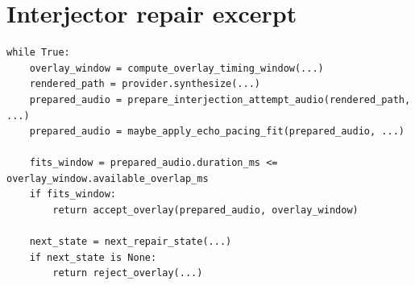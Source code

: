 \section{Interjector repair excerpt}

\begin{lstlisting}[style=cfpython,caption={Condensed stage-4 repair logic adapted from \codepath{src/card_framework/audio_pipeline/interjector.py}.},label={lst:repair}]
while True:
    overlay_window = compute_overlay_timing_window(...)
    rendered_path = provider.synthesize(...)
    prepared_audio = prepare_interjection_attempt_audio(rendered_path, ...)
    prepared_audio = maybe_apply_echo_pacing_fit(prepared_audio, ...)

    fits_window = prepared_audio.duration_ms <= overlay_window.available_overlap_ms
    if fits_window:
        return accept_overlay(prepared_audio, overlay_window)

    next_state = next_repair_state(...)
    if next_state is None:
        return reject_overlay(...)
\end{lstlisting}
